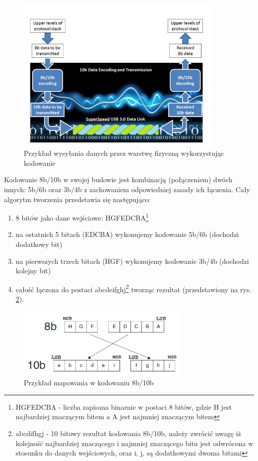 \documentclass{BscUS}
\begin{document}
\begin{figure}[H]
\centering
\includegraphics[width=0.9\textwidth]{./img/SendingData}
\caption{Przykład wysyłania danych przez warstwę fizyczną wykorzystując kodowanie \cite{SendingData}}
\label{fig:sendingDataThroughPHYLayer}
\end{figure}
\indent Kodowanie 8b/10b w swojej budowie jest kombinacją (połączeniem) dwóch innych: 5b/6b oraz 3b/4b z zachowaniem odpowiedniej zasady ich łączenia. Cały algorytm tworzenia przedstawia się następująco:
\begin{enumerate}
\item 8 bitów jako dane wejściowe: HGFEDCBA\footnote{HGFEDCBA - liczba zapisana binarnie w postaci 8 bitów, gdzie H jest najbardziej znaczącym bitem a A jest najmniej znaczącym bitem}
\item na ostatnich 5 bitach (EDCBA) wykonujemy kodowanie 5b/6b (dochodzi dodatkowy bit)
\item na pierwszych trzech bitach (HGF) wykonujemy kodowanie 3b/4b (dochodzi kolejny bit)
\item całość łączona do postaci abcdeifghj\footnote{abcdifhgj - 10 bitowy rezultat kodowania 8b/10b, należy zwrócić uwagę iż kolejność najbardziej znaczącego i najmniej znaczącego bitu jest odwrócona w stosunku do danych wejściowych, oraz i, j, są dodatkowymi dwoma bitami} tworząc rezultat (przedstawiony na rys. \ref{fig:810mapping}).
\end{enumerate}
\begin{figure}[H]
\centering
\includegraphics[width=0.75\textwidth]{./img/mapping810}
\caption{Przykład mapowania w kodowaniu 8b/10b \cite{mapping810}}
\label{fig:810mapping}
\end{figure}
\end{document}
